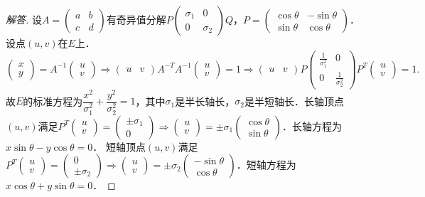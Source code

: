\documentclass[a4paper,fontset=windows]{ctexbook}
\theoremstyle{definition}
\begin{document}
\begin{proof}[解答]
设$A=\begin{pmatrix}a&b \\ c&d\end{pmatrix}$有奇异值分解$P\begin{pmatrix}\sigma_1&0 \\ 0&\sigma_2\end{pmatrix}Q$，$P=\begin{pmatrix}\cos\theta&-\sin\theta \\ \sin\theta&\cos\theta\end{pmatrix}$．设点$(u,v)$在$E$上．
$$\begin{pmatrix}x \\ y\end{pmatrix}=A^{-1}\begin{pmatrix}u \\ v\end{pmatrix}\Rightarrow\begin{pmatrix}u&v\end{pmatrix}A^{-T}A^{-1}\begin{pmatrix}u \\ v\end{pmatrix}=1\Rightarrow\begin{pmatrix}u&v\end{pmatrix}P\begin{pmatrix}\frac{1}{\sigma_1^2}&0 \\ 0&\frac{1}{\sigma_2^2}\end{pmatrix}P^T\begin{pmatrix}u \\ v\end{pmatrix}=1.$$
故$E$的标准方程为$\dfrac{x^2}{\sigma_1^2}+\dfrac{y^2}{\sigma_2^2}=1$，其中$\sigma_1$是半长轴长，$\sigma_2$是半短轴长．长轴顶点$(u,v)$满足$P^T\begin{pmatrix}u \\ v\end{pmatrix}=\begin{pmatrix}\pm\sigma_1 \\ 0\end{pmatrix}\Rightarrow\begin{pmatrix}u \\ v\end{pmatrix}=\pm\sigma_1\begin{pmatrix}\cos\theta \\ \sin\theta\end{pmatrix}$．长轴方程为$x\sin\theta-y\cos\theta=0$．
短轴顶点$(u,v)$满足$P^T\begin{pmatrix}u \\ v\end{pmatrix}=\begin{pmatrix}0 \\ \pm\sigma_2\end{pmatrix}\Rightarrow\begin{pmatrix}u \\ v\end{pmatrix}=\pm\sigma_2\begin{pmatrix}-\sin\theta \\ \cos\theta\end{pmatrix}$．短轴方程为$x\cos\theta+y\sin\theta=0$．

\end{proof}
\end{document}
